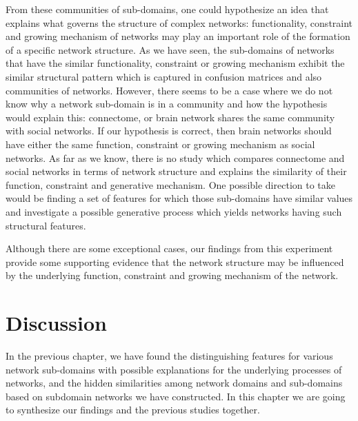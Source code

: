 \documentclass[..]{revtex4}
\begin{document}
From these communities of sub-domains, one could hypothesize an idea that explains what governs the structure of complex networks: functionality, constraint and growing mechanism of networks may play an important role of the formation of a specific network structure. As we have seen, the sub-domains of networks that have the similar functionality, constraint or growing mechanism exhibit the similar structural pattern which is captured in confusion matrices and also communities of networks. However, there seems to be a case where we do not know why a network sub-domain is in a community and how the hypothesis would explain this: connectome, or brain network shares the same community with social networks. If our hypothesis is correct, then brain networks should have either the same function, constraint or growing mechanism as social networks. As far as we know, there is no study which compares connectome and social networks in terms of network structure and explains the similarity of their function, constraint and generative mechanism. One possible direction to take would be finding a set of features for which those sub-domains have similar values and investigate a possible generative process which yields networks having such structural features.

Although there are some exceptional cases, our findings from this experiment provide some supporting evidence that the network structure may be influenced by the underlying function, constraint and growing mechanism of the network.


\newpage
\section{Discussion}
In the previous chapter, we have found the distinguishing features for various network sub-domains with possible explanations for the underlying processes of networks, and the hidden similarities among network domains and sub-domains based on subdomain networks we have constructed. In this chapter we are going to synthesize our findings and the previous studies together.
\end{document}
